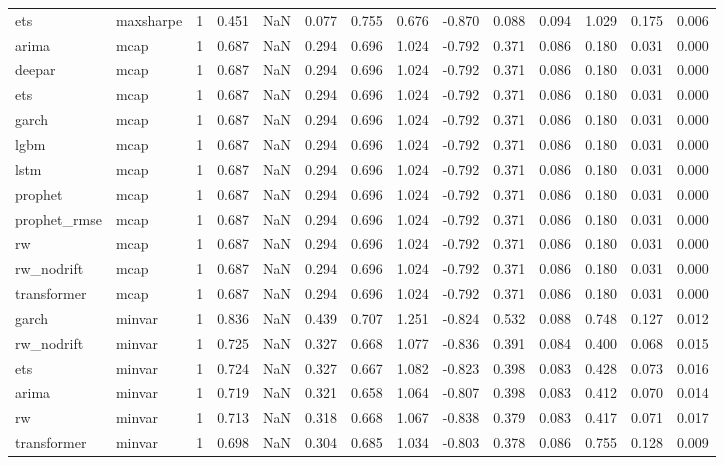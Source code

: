 \begin{table}
\begin{tabular}{llrrrrrrrrrrrr}
ets & maxsharpe & 1 & 0.451 & NaN & 0.077 & 0.755 & 0.676 & -0.870 & 0.088 & 0.094 & 1.029 & 0.175 & 0.006 \\
arima & mcap & 1 & 0.687 & NaN & 0.294 & 0.696 & 1.024 & -0.792 & 0.371 & 0.086 & 0.180 & 0.031 & 0.000 \\
deepar & mcap & 1 & 0.687 & NaN & 0.294 & 0.696 & 1.024 & -0.792 & 0.371 & 0.086 & 0.180 & 0.031 & 0.000 \\
ets & mcap & 1 & 0.687 & NaN & 0.294 & 0.696 & 1.024 & -0.792 & 0.371 & 0.086 & 0.180 & 0.031 & 0.000 \\
garch & mcap & 1 & 0.687 & NaN & 0.294 & 0.696 & 1.024 & -0.792 & 0.371 & 0.086 & 0.180 & 0.031 & 0.000 \\
lgbm & mcap & 1 & 0.687 & NaN & 0.294 & 0.696 & 1.024 & -0.792 & 0.371 & 0.086 & 0.180 & 0.031 & 0.000 \\
lstm & mcap & 1 & 0.687 & NaN & 0.294 & 0.696 & 1.024 & -0.792 & 0.371 & 0.086 & 0.180 & 0.031 & 0.000 \\
prophet & mcap & 1 & 0.687 & NaN & 0.294 & 0.696 & 1.024 & -0.792 & 0.371 & 0.086 & 0.180 & 0.031 & 0.000 \\
prophet\_rmse & mcap & 1 & 0.687 & NaN & 0.294 & 0.696 & 1.024 & -0.792 & 0.371 & 0.086 & 0.180 & 0.031 & 0.000 \\
rw & mcap & 1 & 0.687 & NaN & 0.294 & 0.696 & 1.024 & -0.792 & 0.371 & 0.086 & 0.180 & 0.031 & 0.000 \\
rw\_nodrift & mcap & 1 & 0.687 & NaN & 0.294 & 0.696 & 1.024 & -0.792 & 0.371 & 0.086 & 0.180 & 0.031 & 0.000 \\
transformer & mcap & 1 & 0.687 & NaN & 0.294 & 0.696 & 1.024 & -0.792 & 0.371 & 0.086 & 0.180 & 0.031 & 0.000 \\
garch & minvar & 1 & 0.836 & NaN & 0.439 & 0.707 & 1.251 & -0.824 & 0.532 & 0.088 & 0.748 & 0.127 & 0.012 \\
rw\_nodrift & minvar & 1 & 0.725 & NaN & 0.327 & 0.668 & 1.077 & -0.836 & 0.391 & 0.084 & 0.400 & 0.068 & 0.015 \\
ets & minvar & 1 & 0.724 & NaN & 0.327 & 0.667 & 1.082 & -0.823 & 0.398 & 0.083 & 0.428 & 0.073 & 0.016 \\
arima & minvar & 1 & 0.719 & NaN & 0.321 & 0.658 & 1.064 & -0.807 & 0.398 & 0.083 & 0.412 & 0.070 & 0.014 \\
rw & minvar & 1 & 0.713 & NaN & 0.318 & 0.668 & 1.067 & -0.838 & 0.379 & 0.083 & 0.417 & 0.071 & 0.017 \\
transformer & minvar & 1 & 0.698 & NaN & 0.304 & 0.685 & 1.034 & -0.803 & 0.378 & 0.086 & 0.755 & 0.128 & 0.009 \\

\end{tabular}
\end{table}
